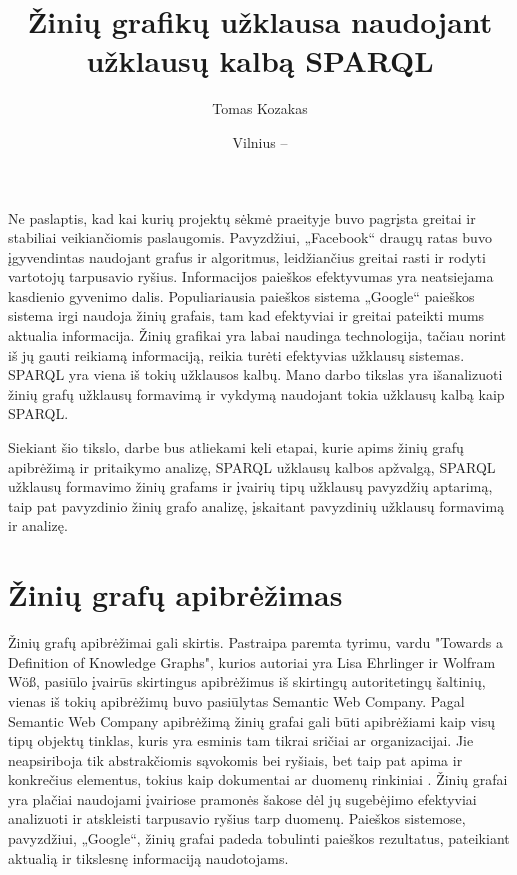 \documentclass{VUMIFPSkursinis}
\institute{Informatikos institutas}  %
\title{Žinių grafikų užklausa naudojant užklausų kalbą SPARQL}
\author{Tomas Kozakas}
\date{Vilnius – \the\year}
\begin{document}
\maketitle

\tableofcontents

Ne paslaptis, kad kai kurių projektų sėkmė praeityje buvo pagrįsta greitai ir stabiliai veikiančiomis paslaugomis. Pavyzdžiui, „Facebook“ draugų ratas buvo įgyvendintas naudojant grafus ir algoritmus, leidžiančius greitai rasti ir rodyti vartotojų tarpusavio ryšius. Informacijos paieškos efektyvumas yra neatsiejama kasdienio gyvenimo dalis. Populiariausia paieškos sistema „Google“ paieškos sistema irgi naudoja žinių grafais, tam kad efektyviai ir greitai pateikti mums aktualia informacija. Žinių grafikai yra labai naudinga technologija, tačiau norint iš jų gauti reikiamą informaciją, reikia turėti efektyvias užklausų sistemas. SPARQL yra viena iš tokių užklausos kalbų. Mano darbo tikslas yra išanalizuoti žinių grafų užklausų formavimą ir vykdymą naudojant tokia užklausų kalbą kaip SPARQL.

Siekiant šio tikslo, darbe bus atliekami keli etapai, kurie apims žinių grafų apibrėžimą ir pritaikymo analizę, SPARQL užklausų kalbos apžvalgą, SPARQL užklausų formavimo žinių grafams ir įvairių tipų užklausų pavyzdžių aptarimą, taip pat pavyzdinio žinių grafo analizę, įskaitant pavyzdinių užklausų formavimą ir analizę.

\section{Žinių grafų apibrėžimas}
Žinių grafų apibrėžimai gali skirtis. Pastraipa paremta tyrimu, vardu "Towards a Definition of Knowledge Graphs", kurios autoriai yra Lisa Ehrlinger ir Wolfram Wöß, pasiūlo įvairūs skirtingus apibrėžimus iš skirtingų autoritetingų šaltinių, vienas iš tokių apibrėžimų buvo pasiūlytas Semantic Web Company.
Pagal Semantic Web Company apibrėžimą žinių grafai gali būti apibrėžiami kaip visų tipų objektų tinklas, kuris yra esminis tam tikrai sričiai ar organizacijai. Jie neapsiriboja tik abstrakčiomis sąvokomis bei ryšiais, bet taip pat apima ir konkrečius elementus, tokius kaip dokumentai ar duomenų rinkiniai \cite{SemanticWebCompany}. Žinių grafai yra plačiai naudojami įvairiose pramonės šakose dėl jų sugebėjimo efektyviai analizuoti ir atskleisti tarpusavio ryšius tarp duomenų. Paieškos sistemose, pavyzdžiui, „Google“, žinių grafai padeda tobulinti paieškos rezultatus, pateikiant aktualią ir tikslesnę informaciją naudotojams. 
\end{document}
